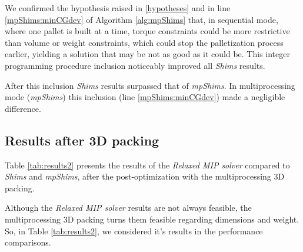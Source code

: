 \documentclass[preprint,authoryear]{elsarticle}
\begin{document}
We confirmed the hypothesis raised in \ref{hypotheses} and in line \ref{mpShims:minCGdev} of Algorithm \ref{alg:mpShims} that, in sequential mode, where one pallet is built at a time, torque constraints could be more restrictive than volume or weight constraints, which could stop the palletization process earlier, yielding a solution that may be not as good as it could be. This integer programming procedure inclusion noticeably improved all {\it Shims} results.

After this inclusion {\it Shims} results surpassed that of {\it mpShims}. In multiprocessing mode ({\it mpShims}) this inclusion (line \ref{mpShims:minCGdev}) made a negligible difference.



\subsection{Results {\bf after} 3D packing}

Table \ref{tab:results2} presents the results of the {\it Relaxed MIP solver} compared to {\it Shims} and {\it mpShims}, after the post-optimization with the multiprocessing 3D packing.

Although the {\it Relaxed MIP solver} results are not always feasible, the multiprocessing 3D packing turns them feasible regarding dimensions and weight. So, in Table \ref{tab:results2}, we considered it's results in the performance comparisons.
\end{document}
